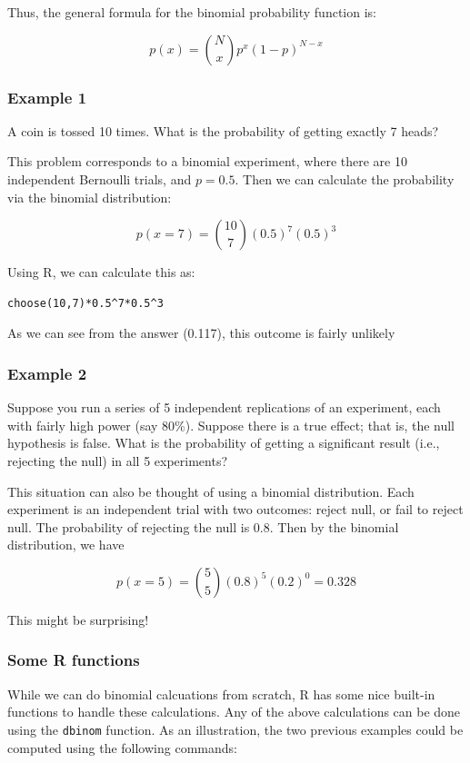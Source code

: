 \documentclass[11pt]{article}
\begin{document}
Thus, the general formula for the binomial probability function is:

\[
p(x) = {N\choose x} p^x(1-p)^{N-x}
\]

\subsubsection*{Example 1}
\label{sec-3-1-1}
A coin is tossed 10 times.  What is the probability of getting exactly 7 heads?

This problem corresponds to a binomial experiment, where there are 10 independent Bernoulli trials, and $p=0.5$.  Then we can calculate the probability via the binomial distribution:

\[
p(x=7) = {10\choose 7} (0.5)^7(0.5)^3
\]

Using R, we can calculate this as:

\begin{verbatim}
choose(10,7)*0.5^7*0.5^3
\end{verbatim}

As we can see from the answer (0.117), this outcome is fairly unlikely

\subsubsection*{Example 2}
\label{sec-3-1-2}
Suppose you run a series of 5 independent replications of an experiment, each with fairly high power (say 80\%).  Suppose there is a true effect; that is, the null hypothesis is false.  What is the probability of getting a significant result (i.e., rejecting the null) in all 5 experiments?

This situation can also be thought of using a binomial distribution.  Each experiment is an independent trial with two outcomes: reject null, or fail to reject null.  The probability of rejecting the null is 0.8.  Then by the binomial distribution, we have

\[
p(x=5) = {5\choose 5} (0.8)^5(0.2)^0 = 0.328
\]

This might be surprising!



\subsubsection*{Some R functions}
\label{sec-3-1-3}

While we can do binomial calcuations from scratch, R has some nice built-in functions to handle these calculations.  Any of the above calculations can be done using the \texttt{dbinom} function.  As an illustration, the two previous examples could be computed using the following commands:
\end{document}
